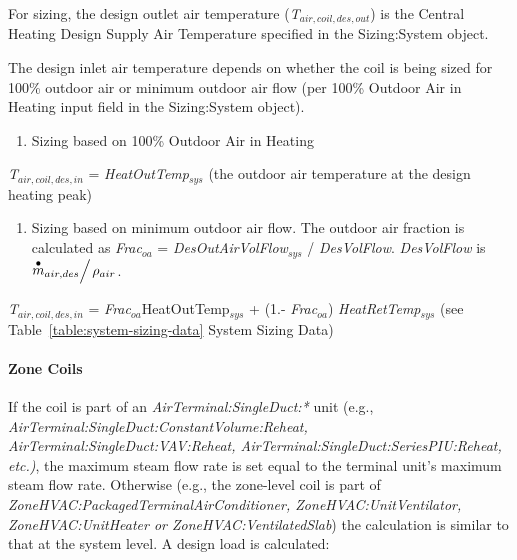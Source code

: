 For sizing, the design outlet air temperature (\emph{T\(_{air,coil,des,out}\)}) is the Central Heating Design Supply Air Temperature specified in the Sizing:System object.

The design inlet air temperature depends on whether the coil is being sized for 100\% outdoor air or minimum outdoor air flow (per 100\% Outdoor Air in Heating input field in the Sizing:System object).

\begin{enumerate}
\def\labelenumi{\arabic{enumi})}
\tightlist
\item
  Sizing based on 100\% Outdoor Air in Heating
\end{enumerate}

\emph{T\(_{air,coil,des,in}\)} = \emph{HeatOutTemp\(_{sys}\)} (the outdoor air temperature at the design heating peak)

\begin{enumerate}
\def\labelenumi{\arabic{enumi})}
\setcounter{enumi}{1}
\tightlist
\item
  Sizing based on minimum outdoor air flow. The outdoor air fraction is calculated as \emph{Frac}\(_{oa}\) = \emph{DesOutAirVolFlow\(_{sys}\)} / \emph{DesVolFlow}. \emph{DesVolFlow} is \({{{{\mathop m\limits^ \bullet }_{air,des}}} \mathord{\left/ {\vphantom {{{{\mathop m\limits^ \bullet }_{air,des}}} {{\rho_{air}}}}} \right. } {{\rho_{air}}}}\).
\end{enumerate}

\emph{T\(_{air,coil,des,in}\)} = \emph{Frac}\(_{oa}\)HeatOutTemp\(_{sys}\) + (1.- \emph{Frac\(_{oa}\)}) \emph{HeatRetTemp\(_{sys}\)} (see Table~\ref{table:system-sizing-data} System Sizing Data)

\paragraph{Zone Coils}\label{zone-coils-2}

If the coil is part of an \emph{AirTerminal:SingleDuct:*} unit (e.g., \emph{Air\-Terminal:\-Single\-Duct:\-Constant\-Volume\-:Re\-heat, Air\-Terminal:\-Single\-Duct:\-VAV:\-Re\-heat, Air\-Terminal:\-Single\-Duct:\-Series\-PIU:\-Re\-heat, etc.)}, the maximum steam flow rate is set equal to the terminal unit's maximum steam flow rate. Otherwise (e.g., the zone-level coil is part of \emph{Zone\-HVAC:\-Packaged\-Terminal\-Air\-Conditioner, Zone\-HVAC\-:Unit\-Ventilator, Zone\-HVAC\-:Unit\-Heater or Zone\-HVAC:\-Ventilated\-Slab}) the calculation is similar to that at the system level. A design load is calculated:


